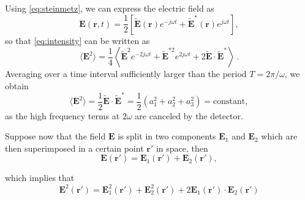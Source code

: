 Using \autoref{eq:steinmetz}, we can express the electric field as
\begin{equation}\label{eq:e-steinmetz}
\textbf{E}(\textbf{r}, t) = \frac{1}{2}\left[ \widetilde{\textbf{E}}(\textbf{r})e^{-j\omega t} + \widetilde{\textbf{E}}^*(\textbf{r})e^{j\omega t}\right],
\end{equation}
so that \autoref{eq:intensity} can be written as
\begin{equation}
	\langle\textbf{E}^2\rangle = \frac{1}{4} \left\langle\widetilde{\textbf{E}}^2 e^{-2j\omega t} + \widetilde{\textbf{E}}^{*2}e^{2j\omega t} + 2  \widetilde{\textbf{E}}\cdot\widetilde{\textbf{E}}^*\right\rangle \,.
\end{equation}
Averaging over a time interval sufficiently larger than the period $T=2\pi/ \omega$, we obtain
\begin{equation}
	\langle \textbf{E}^2 \rangle =\frac{1}{2}\widetilde{\textbf{E}}\cdot\widetilde{\textbf{E}}^* =\frac{1}{2}\left(a_1^2 + a_2^2 + a_3^2\right) = \text{constant},
\end{equation}
as the high frequency terms at $2\omega$ are canceled by the detector.

Suppose now that the field $\textbf{E}$ is split in two components $\textbf{E}_1$ and $\textbf{E}_2$ which are then superimposed in a certain point $\textbf{r}'$ in space, then
\begin{equation}
\textbf{E}(\textbf{r}') = \textbf{E}_1(\textbf{r}') + \textbf{E}_2(\textbf{r}'),
\end{equation}

which implies that
\begin{equation}
	\textbf{E}^2 (\textbf{r}')= \textbf{E}_1^2(\textbf{r}') + \textbf{E}_2^2(\textbf{r}') + 2\textbf{E}_1(\textbf{r}')\cdot\textbf{E}_2(\textbf{r}')
\end{equation}


